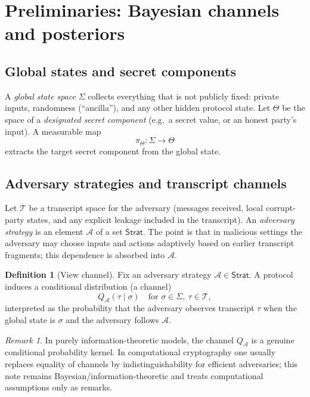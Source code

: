 \documentclass[11pt,a4paper]{article}
\theoremstyle{definition}
\newtheorem{definition}[theorem]{Definition}
\theoremstyle{remark}
\newtheorem{remark}[theorem]{Remark}
\newcommand{\Tau}{\mathcal{T}}
\begin{document}
\section{Preliminaries: Bayesian channels and posteriors}
\label{sec:bayes-prelim}

\subsection{Global states and secret components}
A \emph{global state space} \(\Sigma\) collects everything that is not publicly fixed:
private inputs, randomness (``ancilla''), and any other hidden protocol state.
Let \(\Theta\) be the space of a \emph{designated secret component} (e.g.\ a secret value, or an honest party's input). A measurable map
\[
\pi_\Theta : \Sigma \to \Theta
\]
extracts the target secret component from the global state.

\subsection{Adversary strategies and transcript channels}
Let \(\Tau\) be a transcript space for the adversary (messages received, local corrupt-party states, and any explicit leakage included in the transcript).
An \emph{adversary strategy} is an element \(\mathcal{A}\) of a set \(\mathsf{Strat}\). The point is that in malicious settings the adversary may choose inputs and actions adaptively based on earlier transcript fragments; this dependence is absorbed into \(\mathcal{A}\).

\begin{definition}[View channel]
\label{def:view-channel}
Fix an adversary strategy \(\mathcal{A}\in\mathsf{Strat}\).
A protocol induces a conditional distribution (a channel)
\[
Q_{\mathcal{A}}(\tau \mid \sigma) \quad \text{for } \sigma\in\Sigma,\ \tau\in\Tau,
\]
interpreted as the probability that the adversary observes transcript \(\tau\) when the global state is \(\sigma\) and the adversary follows \(\mathcal{A}\).
\end{definition}

\begin{remark}
In purely information-theoretic models, the channel \(Q_{\mathcal{A}}\) is a genuine conditional probability kernel. In computational cryptography one usually replaces equality of channels by indistinguishability for efficient adversaries; this note remains Bayesian/information-theoretic and treats computational assumptions only as remarks.
\end{remark}
\end{document}
